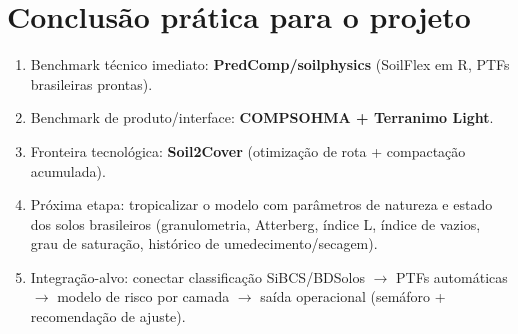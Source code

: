 \documentclass[12pt,a4paper]{article}
\newcommand{\Section}[1]{\needspace{12\baselineskip}\section{#1}}
\newenvironment{NoBreakEnumerate}
{\begin{samepage}\begin{enumerate}}
{\end{enumerate}\end{samepage}}
\begin{document}
\Section{Conclusão prática para o projeto}
\begin{NoBreakEnumerate}
  \item Benchmark técnico imediato: \textbf{PredComp/soilphysics} (SoilFlex em R, PTFs brasileiras prontas).
  \item Benchmark de produto/interface: \textbf{COMPSOHMA + Terranimo Light}.
  \item Fronteira tecnológica: \textbf{Soil2Cover} (otimização de rota + compactação acumulada).
  \item Próxima etapa: tropicalizar o modelo com parâmetros de natureza e estado dos solos brasileiros (granulometria, Atterberg, índice L, índice de vazios, grau de saturação, histórico de umedecimento/secagem).
  \item Integração-alvo: conectar classificação SiBCS/BDSolos $\to$ PTFs automáticas $\to$ modelo de risco por camada $\to$ saída operacional (semáforo + recomendação de ajuste).
\end{NoBreakEnumerate}
\end{document}
